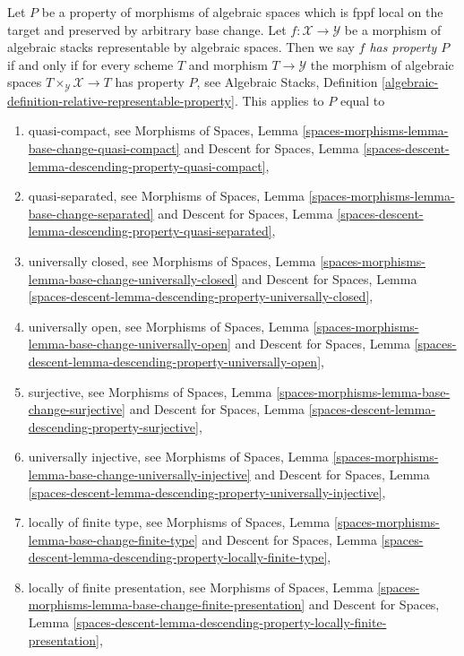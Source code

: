 \medskip\noindent
Let $P$ be a property of morphisms of algebraic spaces which is
fppf local on the target and preserved by arbitrary base change.
Let $f : \mathcal{X} \to \mathcal{Y}$ be a morphism of algebraic stacks
representable by algebraic spaces. Then we say
{\it $f$ has property $P$} if and only if for every scheme $T$
and morphism $T \to \mathcal{Y}$ the morphism of algebraic spaces
$T \times_{\mathcal{Y}} \mathcal{X} \to T$ has property $P$, see
Algebraic Stacks,
Definition \ref{algebraic-definition-relative-representable-property}.
This applies to $P$ equal to
\begin{enumerate}
\item quasi-compact, see
Morphisms of Spaces,
Lemma \ref{spaces-morphisms-lemma-base-change-quasi-compact}
and
Descent for Spaces,
Lemma \ref{spaces-descent-lemma-descending-property-quasi-compact},
\item quasi-separated, see
Morphisms of Spaces,
Lemma \ref{spaces-morphisms-lemma-base-change-separated}
and
Descent for Spaces,
Lemma \ref{spaces-descent-lemma-descending-property-quasi-separated},
\item universally closed, see
Morphisms of Spaces,
Lemma \ref{spaces-morphisms-lemma-base-change-universally-closed}
and
Descent for Spaces,
Lemma \ref{spaces-descent-lemma-descending-property-universally-closed},
\item universally open, see
Morphisms of Spaces,
Lemma \ref{spaces-morphisms-lemma-base-change-universally-open}
and
Descent for Spaces,
Lemma \ref{spaces-descent-lemma-descending-property-universally-open},
\item surjective, see
Morphisms of Spaces,
Lemma \ref{spaces-morphisms-lemma-base-change-surjective}
and
Descent for Spaces,
Lemma \ref{spaces-descent-lemma-descending-property-surjective},
\item universally injective, see
Morphisms of Spaces,
Lemma \ref{spaces-morphisms-lemma-base-change-universally-injective}
and
Descent for Spaces,
Lemma \ref{spaces-descent-lemma-descending-property-universally-injective},
\item locally of finite type, see
Morphisms of Spaces,
Lemma \ref{spaces-morphisms-lemma-base-change-finite-type}
and
Descent for Spaces,
Lemma \ref{spaces-descent-lemma-descending-property-locally-finite-type},
\item locally of finite presentation, see
Morphisms of Spaces,
Lemma \ref{spaces-morphisms-lemma-base-change-finite-presentation}
and
Descent for Spaces, Lemma
\ref{spaces-descent-lemma-descending-property-locally-finite-presentation},

\end{enumerate}
